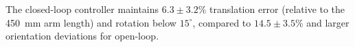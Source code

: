 The closed-loop controller maintains $6.3 \pm 3.2\%$ translation error (relative to the 450~mm arm length) and rotation below $15^\circ$, compared to $14.5 \pm 3.5\%$ and larger orientation deviations for open-loop.
